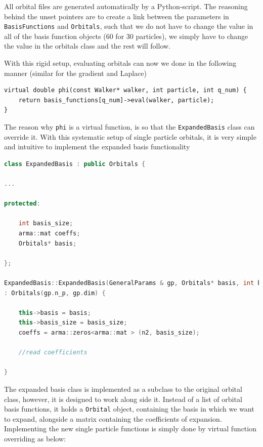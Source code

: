 All orbital files are generated automatically by a Python-script. The reasoning behind the unset pointers are to create a link between the parameters in \verb+BasisFunctions+ and \verb+Orbitals+, such that we do not have to change the value in all of the basis function objects (60 for 30 particles), we simply have to change the value in the orbitals class and the rest will follow.

With this rigid setup, evaluating orbitals can now we done in the following manner (similar for the gradient and Laplace)

\vspace{0.5cm}
\begin{lstlisting}
virtual double phi(const Walker* walker, int particle, int q_num) {
    return basis_functions[q_num]->eval(walker, particle);
}
\end{lstlisting}

The reason why \verb+phi+ is a virtual function, is so that the \verb+ExpandedBasis+ class can override it. With this systematic setup of single particle orbitals, it is very simple and intuitive to implement the expanded basis functionality

\vspace{0.5cm}
\begin{lstlisting}[language=C++]
class ExpandedBasis : public Orbitals {

...

protected:

    int basis_size;
    arma::mat coeffs;
    Orbitals* basis;

};

ExpandedBasis::ExpandedBasis(GeneralParams & gp, Orbitals* basis, int basis_size, std::string coeffPath)
: Orbitals(gp.n_p, gp.dim) {

    this->basis = basis;
    this->basis_size = basis_size;
    coeffs = arma::zeros<arma::mat > (n2, basis_size);

    //read coefficients

}

\end{lstlisting}

The expanded basis class is implemented as a subclass to the original orbital class, however, it is designed to work along side it. Instead of a list of orbital basis functions, it holds a \verb+Orbital+ object, containing the basis in which we want to expand, alongside a matrix containing the coefficients of expansion. Implementing the new single particle functions is simply done by virtual function overriding as below: 

